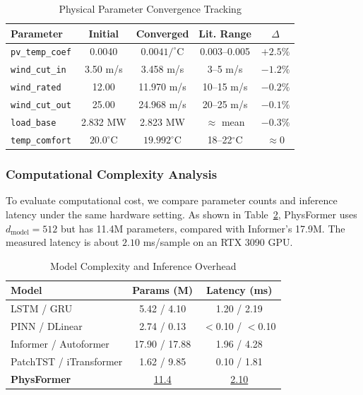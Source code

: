 \begin{table}[htbp]
\centering
\caption{Physical Parameter Convergence Tracking}
\label{tab:physical_params}
\footnotesize
\setlength{\tabcolsep}{3pt}
\begin{tabular*}{\columnwidth}{@{\extracolsep{\fill}}lcccc@{}}
\toprule
Parameter & Initial & Converged & Lit. Range & $\Delta$ \\
\midrule
\texttt{pv\_temp\_coef} & 0.0040 & $0.0041/^\circ$C & 0.003--0.005 & $+2.5\%$ \\
\texttt{wind\_cut\_in} & 3.50 m/s & 3.458 m/s & 3--5 m/s & $-1.2\%$ \\
\texttt{wind\_rated} & 12.00 & 11.970 m/s & 10--15 m/s & $-0.2\%$ \\
\texttt{wind\_cut\_out} & 25.00 & 24.968 m/s & 20--25 m/s & $-0.1\%$ \\
\texttt{load\_base} & 2.832 MW & 2.823 MW & $\approx$ mean & $-0.3\%$ \\
\texttt{temp\_comfort} & $20.0^\circ$C & $19.992^\circ$C & 18--22$^\circ$C & $\approx 0$ \\
\bottomrule
\end{tabular*}
\end{table}

\subsubsection{Computational Complexity Analysis}
\label{subsubsec:overhead}

To evaluate computational cost, we compare parameter counts and inference latency under the same hardware setting. As shown in Table~\ref{tab:overhead}, PhysFormer uses $d_\text{model}=512$ but has 11.4M parameters, compared with Informer's 17.9M. The measured latency is about $2.10$ ms/sample on an RTX 3090 GPU.

\begin{table}[htbp]
\centering
\caption{Model Complexity and Inference Overhead}
\label{tab:overhead}
\footnotesize
\setlength{\tabcolsep}{2pt}
\begin{tabular*}{\columnwidth}{@{\extracolsep{\fill}}lcc@{}}
\toprule
Model & Params (M) & Latency (ms) \\
\midrule
LSTM / GRU & 5.42 / 4.10 & 1.20 / 2.19 \\
PINN / DLinear & 2.74 / 0.13 & $<$0.10 / $<$0.10 \\
Informer / Autoformer & 17.90 / 17.88 & 1.96 / 4.28 \\
PatchTST / iTransformer & 1.62 / 9.85 & 0.10 / 1.81 \\
\textbf{PhysFormer} & \underline{11.4} & \underline{2.10} \\
\bottomrule
\end{tabular*}
\end{table}

